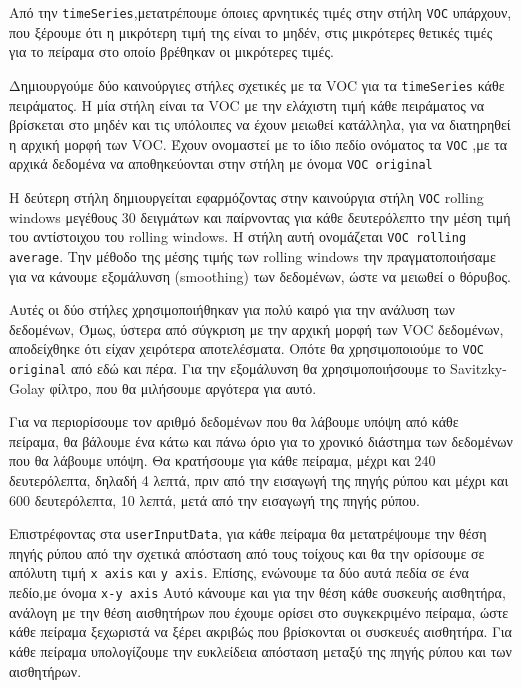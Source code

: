 Από την \texttt{timeSeries},μετατρέπουμε όποιες αρνητικές τιμές στην στήλη \texttt{VOC} υπάρχουν,
που ξέρουμε ότι η μικρότερη τιμή της είναι το μηδέν, στις μικρότερες θετικές τιμές για το πείραμα στο οποίο βρέθηκαν οι μικρότερες τιμές.

Δημιουργούμε δύο καινούργιες στήλες σχετικές με τα VOC για τα \texttt{timeSeries} κάθε πειράματος.
Η μία στήλη είναι τα VOC με την ελάχιστη τιμή κάθε πειράματος να βρίσκεται στο μηδέν και τις υπόλοιπες να
έχουν μειωθεί κατάλληλα, για να διατηρηθεί η αρχική μορφή των VOC.
Έχουν ονομαστεί με το ίδιο πεδίο ονόματος τα \texttt{VOC} ,με τα αρχικά δεδομένα να αποθηκεύονται στην στήλη με όνομα  \texttt{VOC original}

Η δεύτερη στήλη δημιουργείται εφαρμόζοντας στην καινούργια στήλη \texttt{VOC} rolling windows μεγέθους 30 δειγμάτων
και παίρνοντας για κάθε δευτερόλεπτο την μέση τιμή του αντίστοιχου του rolling windows.
Η στήλη αυτή ονομάζεται \texttt{VOC rolling average}. 
Την μέθοδο της μέσης τιμής των rolling windows την πραγματοποιήσαμε
για να κάνουμε εξομάλυνση (smoothing) των δεδομένων, ώστε να μειωθεί ο θόρυβος.

Αυτές οι δύο στήλες χρησιμοποιήθηκαν για πολύ καιρό για την ανάλυση των δεδομένων,
Όμως, ύστερα από σύγκριση με την αρχική μορφή των VOC δεδομένων, αποδείχθηκε ότι είχαν χειρότερα αποτελέσματα.
Οπότε θα χρησιμοποιούμε το \texttt{VOC original} από εδώ και πέρα.
Για την εξομάλυνση θα χρησιμοποιήσουμε το Savitzky-Golay φίλτρο, που θα μιλήσουμε αργότερα για αυτό.

Για να περιορίσουμε τον αριθμό δεδομένων που θα λάβουμε υπόψη από κάθε πείραμα, θα βάλουμε ένα κάτω και πάνω όριο
για το χρονικό διάστημα των δεδομένων που θα λάβουμε υπόψη.
Θα κρατήσουμε για κάθε πείραμα, μέχρι και 240 δευτερόλεπτα, δηλαδή 4 λεπτά, πριν από την εισαγωγή της πηγής ρύπου και
μέχρι και 600 δευτερόλεπτα, 10 λεπτά, μετά από την εισαγωγή της πηγής ρύπου.

Επιστρέφοντας στα \texttt{userInputData}, για κάθε πείραμα θα μετατρέψουμε την θέση πηγής ρύπου 
από την σχετικά απόσταση από τους τοίχους και θα την ορίσουμε σε απόλυτη τιμή \texttt{x axis} και \texttt{y axis}.
Επίσης, ενώνουμε τα δύο αυτά πεδία σε ένα πεδίο,με όνομα \texttt{x-y axis}
Αυτό κάνουμε και για την θέση κάθε συσκευής αισθητήρα, ανάλογη με την θέση αισθητήρων που έχουμε ορίσει στο συγκεκριμένο πείραμα,
ώστε κάθε πείραμα ξεχωριστά να ξέρει ακριβώς που βρίσκονται οι συσκευές αισθητήρα.
Για κάθε πείραμα υπολογίζουμε την ευκλείδεια απόσταση μεταξύ της πηγής ρύπου και των αισθητήρων.

